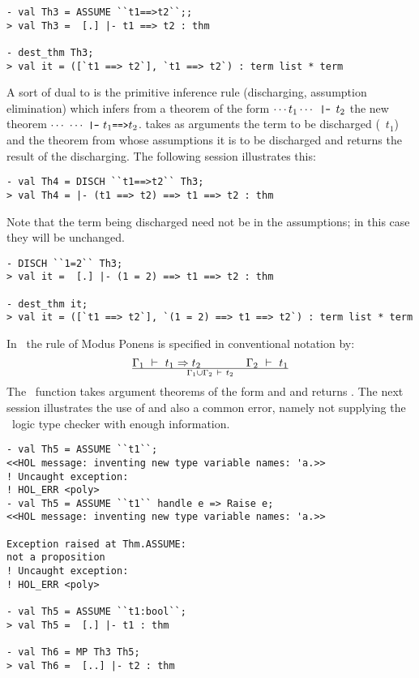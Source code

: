 \begin{session}
\begin{verbatim}
- val Th3 = ASSUME ``t1==>t2``;;
> val Th3 =  [.] |- t1 ==> t2 : thm

- dest_thm Th3;
> val it = ([`t1 ==> t2`], `t1 ==> t2`) : term list * term
\end{verbatim}
\end{session}

A sort of dual to  is the primitive inference rule
 (discharging, assumption elimination) which infers from
a theorem of the form $\cdots t_1\cdots\ml{\ |-\ }t_2$ the new theorem
$\cdots\ \cdots\ \ml{|-}\ t_1\ml{==>}t_2$.  takes as arguments
the term to be discharged (\ie\ $t_1$) and the theorem from whose
assumptions it is to be discharged and returns the result of the discharging.
The following session illustrates this:

\begin{session}
\begin{verbatim}
- val Th4 = DISCH ``t1==>t2`` Th3;
> val Th4 = |- (t1 ==> t2) ==> t1 ==> t2 : thm
\end{verbatim}
\end{session}
Note that the term being discharged need not be in the assumptions; in
this case they will be unchanged.

\begin{session}\begin{verbatim}
- DISCH ``1=2`` Th3;
> val it =  [.] |- (1 = 2) ==> t1 ==> t2 : thm

- dest_thm it;
> val it = ([`t1 ==> t2`], `(1 = 2) ==> t1 ==> t2`) : term list * term
\end{verbatim}\end{session}

    In \HOL\, the rule  of Modus Ponens is specified in
    conventional notation by:
\[
\Gamma_1 \ \vdash\  t_1 \Rightarrow t_2 \qquad\qquad \Gamma_2\ \vdash\  t_1\over
\Gamma_1 \cup \Gamma_2 \ \vdash\  t_2
\]
The \ML\ function  takes argument theorems of the form
 and  and
returns . The next session illustrates the use
of  and also a common error, namely not supplying the \HOL\
logic type checker with enough information.

\begin{session}\begin{verbatim}
- val Th5 = ASSUME ``t1``;
<<HOL message: inventing new type variable names: 'a.>>
! Uncaught exception:
! HOL_ERR <poly>
- val Th5 = ASSUME ``t1`` handle e => Raise e;
<<HOL message: inventing new type variable names: 'a.>>

Exception raised at Thm.ASSUME:
not a proposition
! Uncaught exception:
! HOL_ERR <poly>

- val Th5 = ASSUME ``t1:bool``;
> val Th5 =  [.] |- t1 : thm

- val Th6 = MP Th3 Th5;
> val Th6 =  [..] |- t2 : thm
\end{verbatim}\end{session}

